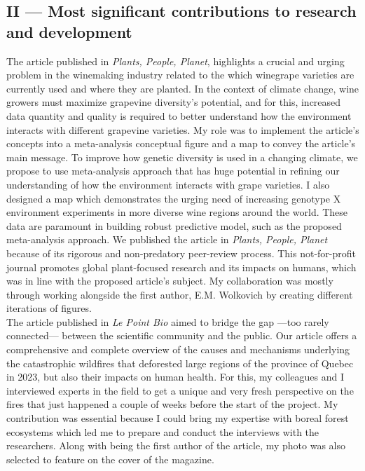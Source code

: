 \documentclass[12pt]{article}
\begin{document}
\subsection*{II --- Most significant contributions to research and development}
The article published in \textit{Plants, People, Planet}, highlights a crucial and urging problem in the winemaking industry related to the which winegrape varieties are currently used and where they are planted. In the context of climate change, wine growers must maximize grapevine diversity's potential, and for this, increased data quantity and quality is required to better understand how the environment interacts with different grapevine varieties. My role was to implement the article's concepts into a meta-analysis conceptual figure and a map to convey the article's main message. To improve how genetic diversity is used in a changing climate, we propose to use meta-analysis approach that has huge potential in refining our understanding of how the environment interacts with grape varieties. I also designed a map which demonstrates the urging need of increasing genotype X environment experiments in more diverse wine regions around the world. These data are paramount in building robust predictive model, such as the proposed meta-analysis approach. We published the article in \textit{Plants, People, Planet} because of its rigorous and non-predatory peer-review process. This not-for-profit journal promotes global plant-focused research and its impacts on humans, which was in line with the proposed article's subject. My collaboration was mostly through working alongside the first author, E.M. Wolkovich by creating different iterations of figures. \\

The article published in \textit{Le Point Bio} aimed to bridge the gap ---too rarely connected--- between the scientific community and the public. Our article offers a comprehensive and complete overview of the causes and mechanisms underlying the catastrophic wildfires that deforested large regions of the province of Quebec in 2023, but also their impacts on human health. For this, my colleagues and I interviewed experts in the field to get a unique and very fresh perspective on the fires that just happened a couple of weeks before the start of the project. My contribution was essential because I could bring my expertise with boreal forest ecosystems which led me to prepare and conduct the interviews with the researchers. Along with being the first author of the article, my photo was also selected to feature on the cover of the magazine. 
\end{document}
